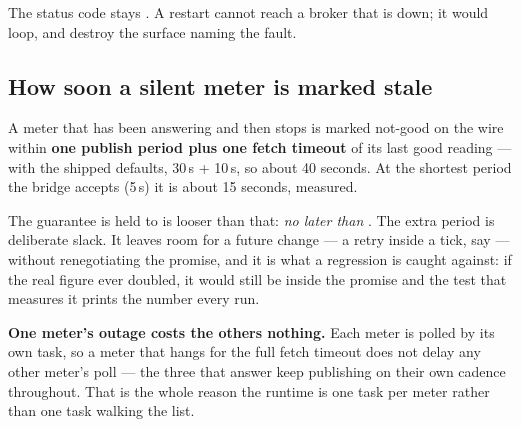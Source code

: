 The status code stays . A restart cannot reach a broker that is down; it would
loop, and destroy the surface naming the fault.

\subsection{How soon a silent meter is marked stale}
\label{sec:stalenesslatency}

A meter that has been answering and then stops is marked not-good on the wire within
\textbf{one publish period plus one fetch timeout} of its last good reading --- with the shipped
defaults, 30\,s + 10\,s, so about 40 seconds. At the shortest period the bridge accepts (5\,s)
it is about 15 seconds, measured.

The guarantee \prog is held to is looser than that: \emph{no later than} . The extra period is deliberate slack. It leaves room for a future
change --- a retry inside a tick, say --- without renegotiating the promise, and it is what a
regression is caught against: if the real figure ever doubled, it would still be inside the
promise and the test that measures it prints the number every run.

\begin{note}
\textbf{One meter's outage costs the others nothing.} Each meter is polled by its own task, so a
meter that hangs for the full fetch timeout does not delay any other meter's poll --- the three
that answer keep publishing  on their own cadence throughout. That is the whole
reason the runtime is one task per meter rather than one task walking the list.
\end{note}
